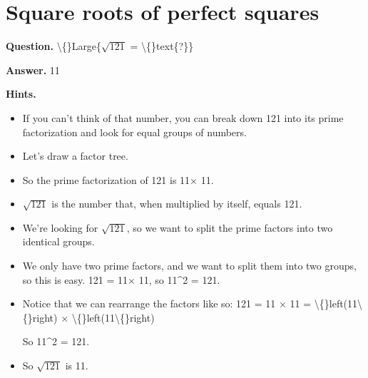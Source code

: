 \documentclass{article}
\begin{document}
\section*{Square roots of perfect squares}
\textbf{Question.} \textbackslash\{\}Large\{$\sqrt{121}$ = \textbackslash\{\}text\{?\}\}

\textbf{Answer.} 11

\textbf{Hints.}
\begin{itemize}
  \item If you can't think of that number, you can break down 121 into
                its prime factorization and look for equal groups of numbers.
  \item Let's draw a factor tree.
  \item So the prime factorization of 121 is 11$\times$ 11.
  \item $\sqrt{121}$ is the number that, when
                        multiplied by itself, equals 121.
  \item We're looking for $\sqrt{121}$, so we want to split the prime factors into two identical groups.
  \item We only have two prime factors, and we want to split them into two groups, so this is easy.
                        121 = 11$\times$ 11, so 11\textasciicircum{}2 = 121.
  \item Notice that we can rearrange the factors like so:
                            121 = 11 $\times$ 11 = \textbackslash\{\}left(11\textbackslash\{\}right) $\times$ \textbackslash\{\}left(11\textbackslash\{\}right)
                        

                        
                            So 11\textasciicircum{}2 = 121.
  \item So $\sqrt{121}$ is 11.
\end{itemize}
\end{document}
